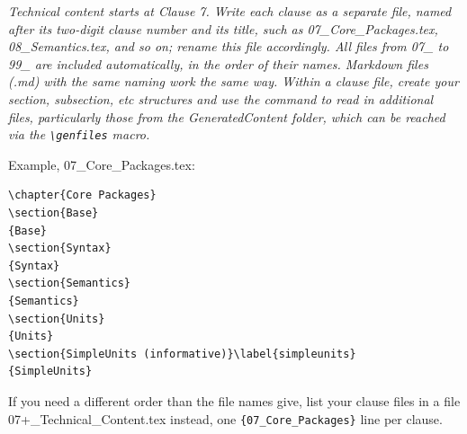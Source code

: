 \color{red}
{ \itshape Technical content starts at Clause 7. Write each clause as a separate file, named after its two-digit clause number and its title, such as 07\_Core\_Packages.tex, 08\_Semantics.tex, and so on; rename this file accordingly. All files from 07\_ to 99\_ are included automatically, in the order of their names. Markdown files (.md) with the same naming work the same way. Within a clause file, create your section, subsection, etc structures and use the \lstinline!! command to read in additional files, particularly those from the GeneratedContent folder, which can be reached via the \lstinline!\genfiles! macro.

Example, 07\_Core\_Packages.tex:
\begin{lstlisting}
\chapter{Core Packages}
\section{Base}
{Base}
\section{Syntax}
{Syntax}
\section{Semantics}
{Semantics}
\section{Units}
{Units}
\section{SimpleUnits (informative)}\label{simpleunits}
{SimpleUnits}
\end{lstlisting}

If you need a different order than the file names give, list your clause files in a file 07+\_Technical\_Content.tex instead, one \lstinline!{07_Core_Packages}! line per clause.
}
\color{black}
